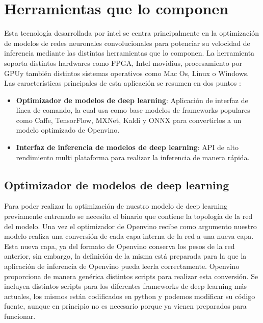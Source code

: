 \section{Herramientas que lo componen}\label{sec:herramientas-que-lo-componen}
Esta tecnología desarrollada por intel se centra principalmente en la optimización de modelos de redes neuronales convolucionales para potenciar su velocidad de inferencia mediante las distintas herramientas que lo componen.
La herramienta soporta distintos hardwares como FPGA, Intel movidius, procesamiento por GPU\@ y también distintos sistemas operativos como Mac Os, Linux o Windows.
Las características principales de esta aplicación se resumen en dos puntos :
\begin{itemize}
    \item \textbf{Optimizador de modelos de deep learning}: Aplicación de interfaz de línea de comando, la cual usa como base modelos de frameworks populares como Caffe, TensorFlow, MXNet, Kaldi y ONNX para convertirlos a un modelo optimizado de Openvino.
    \item \textbf{Interfaz de inferencia de modelos de deep learning}: API de alto rendimiento multi plataforma para realizar la inferencia de manera rápida.
\end{itemize}

\subsection{Optimizador de modelos de deep learning}\label{subsec:optimizador-de-modelos-de-deep-learning}
Para poder realizar la optimización de nuestro modelo de deep learning previamente entrenado se necesita el binario que contiene la topología de la red del modelo.
Una vez el optimizador de Openvino recibe como argumento nuestro modelo realiza una conversión de cada capa interna de la red a una nueva capa.
Esta nueva capa, ya del formato de Openvino conserva los pesos de la red anterior, sin embargo, la definición de la misma está preparada para la que la aplicación de inferencia de Openvino pueda leerla correctamente.
Openvino proporciona de manera genérica distintos scripts para realizar esta conversión.
Se incluyen distintos scripts para los diferentes frameworks de deep learning más actuales, los mismos están codificados en python y podemos modificar su código fuente, aunque en principio no es necesario porque ya vienen preparados para funcionar.

